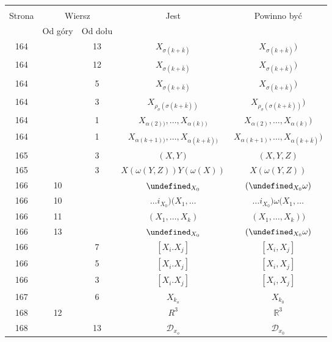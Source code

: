 \documentclass[a4paper,11pt]{article}
\newcommand{\mb}{\mathbb}
\newcommand{\mc}{\mathcal}
\newcommand{\ld}{\ldots}
\newcommand{\al}{\alpha}
\newcommand{\om}{\omega}
\newcommand{\s}{\sigma}
\newcommand{\R}{\mb{R}}
\newcommand{\D}{\mc{D}}
\let\L\undefined
\newcommand{\L}{\mc{L}}
\begin{document}
\begin{center}
  \begin{tabular}{|c|c|c|c|c|}
    \hline
    & \multicolumn{2}{c|}{} & & \\
    Strona & \multicolumn{2}{c|}{Wiersz}& Jest & Powinno być \\ \cline{2-3}
    & Od góry & Od dołu &  &  \\ \hline
    164 & & 13 & $X_{ \s( k + \bar{ k } ) }$
           & $X_{ \s( k + \bar{ k } ) } )$ \\
    164 & & 12 & $X_{ \s( k + \bar{ k } ) }$
           & $X_{ \s( k + \bar{ k } ) } )$ \\
    164 & &  5 & $X_{ \s( k + \bar{ k } ) }$
           & $X_{ \s( k + \bar{ k } ) } )$ \\
    164 & &  3 & $X_{ \rho_{ \s }( \s( k + \bar{ k } ) ) }$
           & $X_{ \rho_{ \s }( \s( k + \bar{ k } ) ) } )$ \\
    164 & &  1 & $X_{ \al( 2 ) ) }, \ld, X_{ \al( k ) ) }$
           & $X_{ \al( 2 ) }, \ld, X_{ \al( k ) } )$ \\
    164 & &  1 & $X_{ \al( k + 1 ) ) }, \ld, X_{ \al( k + \bar{ k } ) ) }$
           & $X_{ \al( k + 1 ) }, \ld, X_{ \al( k + \bar{ k } ) } )$ \\
    165 & &  3 & $( X, Y )$ & $( X, Y, Z )$ \\
    165 & &  3 & $X( \om( Y, Z ) ) Y( \om( X ) )$
           & $X( \om( Y, Z ) )$ \\
    166 & 10 & & $\L_{ { X_{ 0 } } }$ & $( \L_{ { X_{ 0 } } } \om )$ \\
    166 & 10 & & $\ld i_{ { X_{ 0 } } } ) ( X_{ 1 }, \ld$
           & $\ld i_{ { X_{ 0 } } } ) \om( X_{ 1 }, \ld$ \\
    166 & 11 & & $( X_{ 1 }, \ld, X_{ k } )$ & $( X_{ 1 }, \ld,
                                               X_{ k } ))$ \\
    166 & 13 & & $\L_{ { X_{ 0 } } }$ & $( \L_{ { X_{ 0 } } } \om )$ \\
    166 & & 7 & $[ X_{ i }. X_{ j } ]$ & $[ X_{ i }, X_{ j } ]$ \\
    166 & & 5 & $[ X_{ i }. X_{ j } ]$ & $[ X_{ i }, X_{ j } ]$ \\
    166 & & 3 & $[ X_{ i }. X_{ j } ]$ & $[ X_{ i }, X_{ j } ]$ \\
    167 & & 6 & $X_{ k_{ o } }$ & $X_{ k_{ 0 } }$ \\
    168 & 12 & & $R^{ 3 }$ & $\R^{ 3 }$ \\
    168 & & 13 & $\D_{ x_{ o } }$ & $\D_{ x_{ 0 } }$ \\

\end{tabular}
\end{center}
\end{document}
